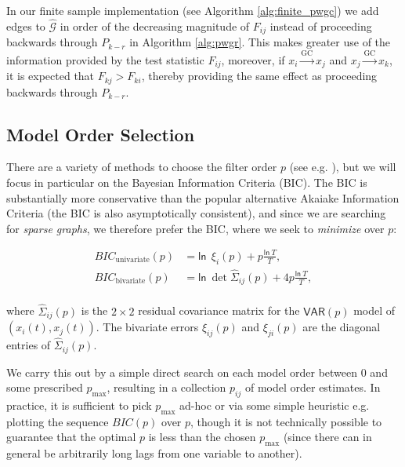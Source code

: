 \documentclass{statsoc}
\def\gc{\overset{\text{GC}}{\rightarrow}}  %
\def\gcg{\mathcal{G}}  %
\def\VAR{\mathsf{VAR}}  %
\def\ln{\mathsf{ln\ }}  %
\begin{document}
In our finite sample implementation (see Algorithm
\ref{alg:finite_pwgc}) we add edges to $\widehat{\gcg}$ in order of
the decreasing magnitude of $F_{ij}$ instead of proceeding backwards
through $P_{k - r}$ in Algorithm \ref{alg:pwgr}.  This makes greater
use of the information provided by the test statistic $F_{ij}$,
moreover, if $x_i \gc x_j$ and $x_j \gc x_k$, it is expected that
$F_{kj} > F_{ki}$, thereby providing the same effect as proceeding
backwards through $P_{k - r}$.
\subsection{Model Order Selection}
\label{sec:model_order_selection}
There are a variety of methods to choose the filter order $p$ (see
e.g. \cite{lutkepohl2005new}), but we will focus in particular on the
Bayesian Information Criteria (BIC).  The BIC is substantially more
conservative than the popular alternative Akaiake Information Criteria
(the BIC is also asymptotically consistent), and since we are
searching for \textit{sparse graphs}, we therefore prefer the BIC,
where we seek to \textit{minimize} over $p$:

\begin{equation}
  \label{eqn:bic}
  \begin{aligned}
    BIC_{\text{univariate}}(p) &= \ln\ \xi_i(p) + p\frac{\ln T}{T},\\
    BIC_{\text{bivariate}}(p) &= \ln \det \widehat{\Sigma}_{ij}(p) + 4p\frac{\ln T}{T},\\
  \end{aligned}
\end{equation}

where $\widehat{\Sigma}_{ij}(p)$ is the $2 \times 2$ residual
covariance matrix for the $\VAR(p)$ model of $(x_i(t), x_j(t))$.  The
bivariate errors $\xi_{ij}(p)$ and $\xi_{ji}(p)$ are the diagonal
entries of $\widehat{\Sigma}_{ij}(p)$.

We carry this out by a simple direct search on each model order
between $0$ and some prescribed $p_\text{max}$, resulting in a
collection $p_{ij}$ of model order estimates.  In practice, it is
sufficient to pick $p_\text{max}$ ad-hoc or via some simple heuristic
e.g. plotting the sequence $BIC(p)$ over $p$, though it is not
technically possible to guarantee that the optimal $p$ is less than
the chosen $p_\text{max}$ (since there can in general be arbitrarily
long lags from one variable to another).
\end{document}
